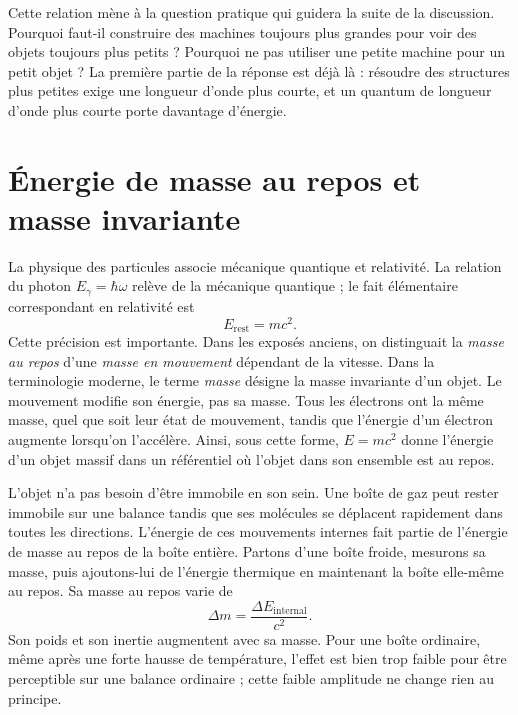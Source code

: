 Cette relation mène à la question pratique qui guidera la suite de la discussion. Pourquoi faut-il construire des machines toujours plus grandes pour voir des objets toujours plus petits ? Pourquoi ne pas utiliser une petite machine pour un petit objet ? La première partie de la réponse est déjà là : résoudre des structures plus petites exige une longueur d’onde plus courte, et un quantum de longueur d’onde plus courte porte davantage d’énergie.

\section{Énergie de masse au repos et masse invariante}

La physique des particules associe mécanique quantique et relativité. La relation du photon \(E_\gamma=\hbar\omega\) relève de la mécanique quantique ; le fait élémentaire correspondant en relativité est
\begin{equation}
E_{\mathrm{rest}}=mc^2.
\end{equation}
Cette précision est importante. Dans les exposés anciens, on distinguait la \emph{masse au repos} d’une \emph{masse en mouvement} dépendant de la vitesse. Dans la terminologie moderne, le terme \emph{masse} désigne la masse invariante d’un objet. Le mouvement modifie son énergie, pas sa masse. Tous les électrons ont la même masse, quel que soit leur état de mouvement, tandis que l’énergie d’un électron augmente lorsqu’on l’accélère. Ainsi, sous cette forme, \(E=mc^2\) donne l’énergie d’un objet massif dans un référentiel où l’objet dans son ensemble est au repos.

L’objet n’a pas besoin d’être immobile en son sein. Une boîte de gaz peut rester immobile sur une balance tandis que ses molécules se déplacent rapidement dans toutes les directions. L’énergie de ces mouvements internes fait partie de l’énergie de masse au repos de la boîte entière. Partons d’une boîte froide, mesurons sa masse, puis ajoutons-lui de l’énergie thermique en maintenant la boîte elle-même au repos. Sa masse au repos varie de
\begin{equation}
\Delta m=\frac{\Delta E_{\mathrm{internal}}}{c^2}.
\end{equation}
Son poids et son inertie augmentent avec sa masse. Pour une boîte ordinaire, même après une forte hausse de température, l’effet est bien trop faible pour être perceptible sur une balance ordinaire ; cette faible amplitude ne change rien au principe.

